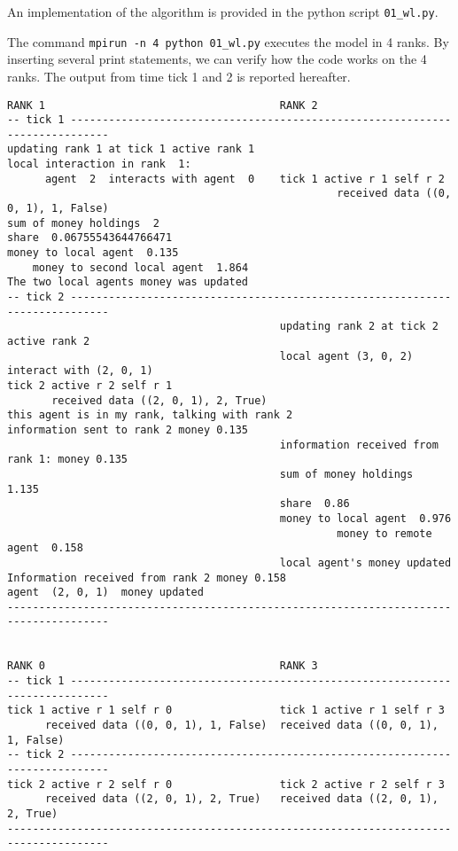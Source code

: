 \documentclass{article}
\begin{document}
An implementation of the algorithm is provided in the python script \verb+01_wl.py+.

The command
\verb+mpirun -n 4 python 01_wl.py+ executes the model in 4 ranks.
By inserting several print statements, we can verify how the code works on the 4 ranks. The output from time tick 1 and 2 is reported hereafter.


\footnotesize
\begin{verbatim}
RANK 1                                     RANK 2
-- tick 1 ----------------------------------------------------------------------------
updating rank 1 at tick 1 active rank 1
local interaction in rank  1:          
      agent  2  interacts with agent  0    tick 1 active r 1 self r 2 
                                                    received data ((0, 0, 1), 1, False)
sum of money holdings  2
share  0.06755543644766471
money to local agent  0.135  
    money to second local agent  1.864 
The two local agents money was updated 
-- tick 2 ----------------------------------------------------------------------------
                                           updating rank 2 at tick 2 active rank 2
                                           local agent (3, 0, 2) interact with (2, 0, 1)
tick 2 active r 2 self r 1 
       received data ((2, 0, 1), 2, True)
this agent is in my rank, talking with rank 2
information sent to rank 2 money 0.135
                                           information received from rank 1: money 0.135
                                           sum of money holdings  1.135
                                           share  0.86
                                           money to local agent  0.976
                                                    money to remote agent  0.158
                                           local agent's money updated
Information received from rank 2 money 0.158
agent  (2, 0, 1)  money updated
--------------------------------------------------------------------------------------


RANK 0                                     RANK 3
-- tick 1 ----------------------------------------------------------------------------
tick 1 active r 1 self r 0                 tick 1 active r 1 self r 3 
      received data ((0, 0, 1), 1, False)  received data ((0, 0, 1), 1, False)
-- tick 2 ----------------------------------------------------------------------------
tick 2 active r 2 self r 0                 tick 2 active r 2 self r 3
      received data ((2, 0, 1), 2, True)   received data ((2, 0, 1), 2, True)
--------------------------------------------------------------------------------------
\end{verbatim}
\normalsize
\end{document}
